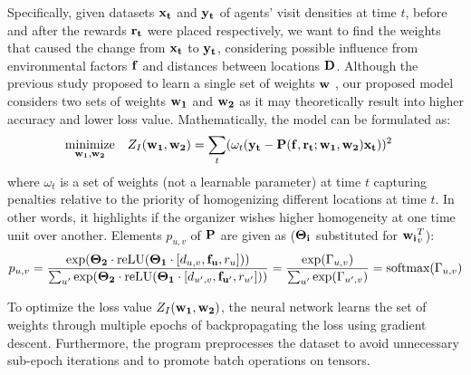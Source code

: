 Specifically, given datasets $\mathbf{x_t}$ and $\mathbf{y_t}$ of agents' visit densities at time $t$, before and after the rewards $\mathbf{r_t}$ were placed respectively, we want to find the weights that caused the change from $\mathbf{x_t}$ to $\mathbf{y_t}$, considering possible influence from environmental factors $\mathbf{f}$ and distances between locations $\mathbf{D}$. Although the previous study proposed to learn a single set of weights $\mathbf{w}$ \cite{Xue2016Avi2}, our proposed model considers two sets of weights $\mathbf{w_1}$ and $\mathbf{w_2}$ as it may theoretically result into higher accuracy and lower loss value. Mathematically, the model can be formulated as:
\begin{equation} \label{eqn:iden_problem}
    \begin{aligned}
        & \underset{\mathbf{w_1}, \mathbf{w_2}}{\text{minimize}}
        & & Z_I(\mathbf{w_1}, \mathbf{w_2}) = \sum_{t} (\omega_t(\mathbf{y_t} - \mathbf{P}(\mathbf{f}, \mathbf{r_t}; \mathbf{w_1}, \mathbf{w_2})\mathbf{x_t}))^{2}
    \end{aligned}
\end{equation}
where $\omega_t$ is a set of weights (not a learnable parameter) at time $t$ capturing penalties relative to the priority of homogenizing different locations at time $t$. In other words, it highlights if the organizer wishes higher homogeneity at one time unit over another. Elements $p_{u, v}$ of $\mathbf{P}$ are given as ($\mathbf{\Theta_i}$ substituted for $\mathbf{w_i}_v^T$):
\begin{equation} \label{eqn:puv_equation}
p_{u, v} = \frac{\exp(\mathbf{\Theta_2} \cdot \text{reLU} (\mathbf{\Theta_1} \cdot [d_{u, v}, \mathbf{f_{u}}, r_{u}]))}{\sum_{u'} \exp(\mathbf{\Theta_2} \cdot \text{reLU} (\mathbf{\Theta_1} \cdot [d_{u', v}, \mathbf{f_{u'}}, r_{u'}]))} = \frac{\exp(\Gamma_{u, v})}{\sum_{u'}\exp(\Gamma_{u', v})} = \text{softmax}(\Gamma_{u, v})
\end{equation}

To optimize the loss value $Z_I(\mathbf{w_1}, \mathbf{w_2})$, the neural network learns the set of weights through multiple epochs of backpropagating the loss using gradient descent. Furthermore, the program preprocesses the dataset to avoid unnecessary sub-epoch iterations and to promote batch operations on tensors.


